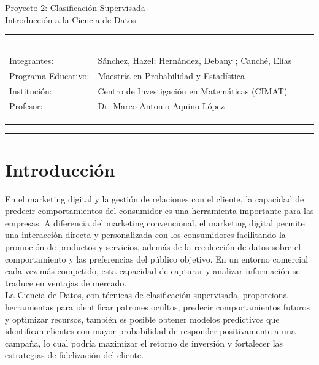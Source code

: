 \documentclass[10pt]{article}
\newcommand{\studentname}{Sánchez, Hazel; Hernández, Debany ; Canché, Elías}
\newcommand{\researchcentre}{Maestría en Probabilidad y Estadística}
\newcommand{\institution}{Centro de Investigación en Matemáticas (CIMAT)}
\newcommand{\supervisor}{Dr. Marco Antonio Aquino López}
\begin{document}
\begin{center}
{\Large{Proyecto 2: Clasificación Supervisada}} \\
\vspace{2mm}
{\Large{Introducción a la Ciencia de Datos}} \\
\end{center}

\vspace{5mm}
\hrule
\vspace{1mm}
\hrule

\vspace{3mm}
\begin{tabular}{ll} 
Integrantes:           	        & {\studentname}   \\ 
Programa Educativo: 	        & {\researchcentre}  \\ 
Institución:                 & {\institution}  \\
Profesor: 	                 & {\supervisor}  \\ 
\end{tabular}

\vspace{3mm}
\hrule
\vspace{1mm}
\hrule

\begin{abstract}

\end{abstract}

\section{Introducción}
En el marketing digital y la gestión de relaciones con el cliente, la capacidad de predecir comportamientos del consumidor es una herramienta importante para las empresas. A diferencia del marketing convencional, el marketing digital permite una interacción directa y personalizada con los consumidores facilitando la promoción de productos y servicios, además de la recolección de datos sobre el comportamiento y las preferencias del público objetivo. En un entorno comercial cada vez más competido, esta capacidad de capturar y analizar información se traduce en ventajas de mercado.\\

La Ciencia de Datos, con técnicas de clasificación supervisada, proporciona herramientas para identificar patrones ocultos, predecir comportamientos futuros y optimizar recursos, también es posible obtener modelos predictivos que identifican clientes con mayor probabilidad de responder positivamente a una campaña, lo cual podría maximizar el retorno de inversión y fortalecer las estrategias de fidelización del cliente.\\
\end{document}

